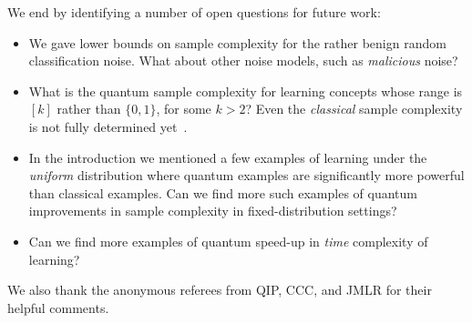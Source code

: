 \documentclass[twoside,11pt]{article}
\newcommand{\eps}{\varepsilon}
\def\01{\{0,1\}}
\begin{document}
We end by identifying a number of open questions for future work:
\begin{itemize}
	\item We gave lower bounds on sample complexity for the rather benign random classification noise.  What about other noise models, such as \emph{malicious} noise?
	\item What is the quantum sample complexity for learning concepts whose range is $[k]$ rather than $\01$, for some $k>2$? Even the \emph{classical} sample complexity is not fully determined yet~\cite[Section~29.2]{shwartz&david:learningbook}.
	\item In the introduction we mentioned a few examples of learning under the \emph{uniform} distribution where quantum examples are significantly more powerful than classical examples.  Can we find more such examples of quantum improvements in sample complexity in fixed-distribution settings?
	\item Can we find more examples of quantum speed-up in \emph{time} complexity of learning?
\end{itemize}

 We also thank the anonymous referees from QIP, CCC, and JMLR for their helpful comments. 


\end{document}
